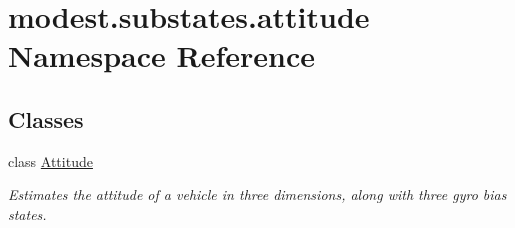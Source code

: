 \hypertarget{namespacemodest_1_1substates_1_1attitude}{}\section{modest.\+substates.\+attitude Namespace Reference}
\label{namespacemodest_1_1substates_1_1attitude}
\subsection*{Classes}
\begin{DoxyCompactItemize}
\item 
class \hyperlink{classmodest_1_1substates_1_1attitude_1_1Attitude}{Attitude}
\begin{DoxyCompactList}\small\item\em Estimates the attitude of a vehicle in three dimensions, along with three gyro bias states. \end{DoxyCompactList}\end{DoxyCompactItemize}
